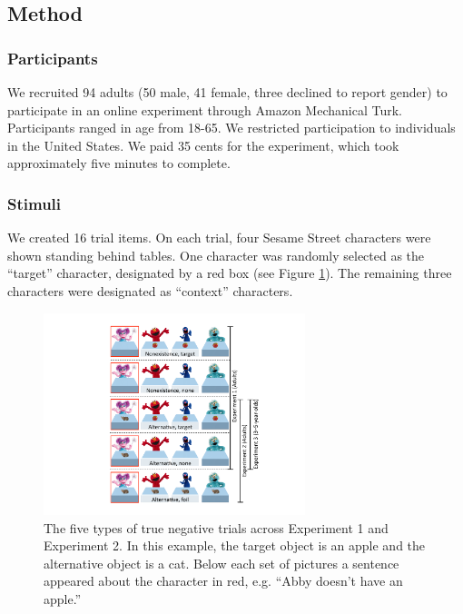 \documentclass[man, noapacite]{apa2}
\begin{document}
\subsection{Method}

\subsubsection{Participants}

We recruited 94 adults (50 male, 41 female, three declined to report gender) to participate in an online experiment through Amazon Mechanical Turk.  Participants ranged in age from 18-65.  We restricted participation to individuals in the United States. We paid 35 cents for the experiment, which took approximately five minutes to complete.  

\subsubsection{Stimuli}

We created 16 trial items. On each trial, four Sesame Street characters were shown standing behind tables.  One character was randomly selected as the ``target'' character, designated by a red box (see Figure \ref{fig:trial}). The remaining three characters were designated as ``context'' characters.


\begin{figure}[t]
\begin{center} 
\includegraphics[width=3in]{figures/trialtypes.pdf}
\caption{\label{fig:trial} The five types of true negative trials across Experiment 1 and Experiment 2.  In this example, the target object is an apple and the alternative object is a cat. Below each set of pictures a sentence appeared about the character in red, e.g. ``Abby doesn't have an apple.''}  
\vspace{-1cm}
\end{center} 
\end{figure}
\end{document}
